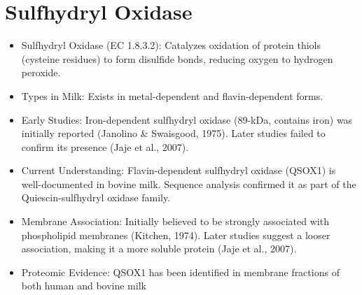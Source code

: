 \section{Sulfhydryl Oxidase}
\begin{itemize}
    \item Sulfhydryl Oxidase (EC 1.8.3.2): Catalyzes oxidation of protein thiols (cysteine residues) to form disulfide bonds, reducing oxygen to hydrogen peroxide.
    \item Types in Milk: Exists in metal-dependent and flavin-dependent forms.
    \item Early Studies:
    \subitem Iron-dependent sulfhydryl oxidase (89-kDa, contains iron) was initially reported (Janolino \& Swaisgood, 1975).
    \subitem Later studies failed to confirm its presence (Jaje et al., 2007).
    \item Current Understanding:
    \subitem Flavin-dependent sulfhydryl oxidase (QSOX1) is well-documented in bovine milk.
    \subitem Sequence analysis confirmed it as part of the Quiescin-sulfhydryl oxidase family.
    \item Membrane Association:
    \subitem Initially believed to be strongly associated with phospholipid membranes (Kitchen, 1974).
    \subitem Later studies suggest a looser association, making it a more soluble protein (Jaje et al., 2007).
    \item Proteomic Evidence: 
    \subitem QSOX1 has been identified in membrane fractions of both human and bovine milk
\end{itemize}

